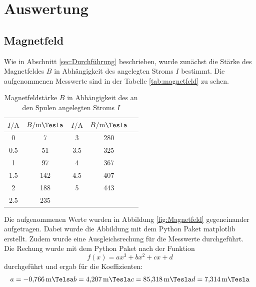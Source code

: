 \section{Auswertung}
\label{sec:Auswertung}
\subsection{Magnetfeld}
Wie in Abschnitt \ref{sec:Durchführung} beschrieben, wurde zunächst die Stärke des Magnetfeldes $B$ in Abhängigkeit des angelegten Stroms $I$ bestimmt.
Die aufgenommenen Messwerte sind in der Tabelle \ref{tab:magnetfeld} zu sehen.

\begin{table}
    \centering
    \caption{Magnetfeldstärke $B$ in Abhängigkeit des an den Spulen angelegten Stroms $I$}
    \begin{tabular}{S[table-format=3.1] S S S S}
        \toprule
        $I / \si{\ampere}$ & $B / \si{\milli\Tesla}$ &$I / \si{\ampere}$ & $B / \si{\milli\Tesla}$ \\
           &     7 &   3   & 280 \\
        0.5 &    51 &   3.5 & 325 \\
        1   &    97 &   4   & 367 \\
        1.5 &   142 &   4.5 & 407 \\
        2   &   188 &   5   & 443 \\
        2.5& 235 & & \\
        \bottomrule
    \end{tabular}
    \label{tab:Magnetfeld}
\end{table}

Die aufgenommenen Werte wurden in Abbildung \autoref{fig:Magnetfeld} gegeneinander aufgetragen.
Dabei wurde die Abbildung mit dem Python Paket matplotlib \cite{matplotlib} erstellt.
Zudem wurde eine Ausgleichsrechung für die Messwerte durchgeführt.
Die Rechung wurde mit dem Python Paket \cite{scipy} nach der Funktion
\begin{equation*}
    f(x) = ax^3 +bx^2+cx+d
\end{equation*}
durchgeführt und ergab für die Koeffizienten:
\begin{align*}
    a = \SI{-0.766}{\milli\Telsa}
    b = \SI{4.207}{\milli\Tesla}
    c = \SI{85.318}{\milli\Tesla}
    d = \SI{7.314}{\milli\Tesla}
\end{align*}

